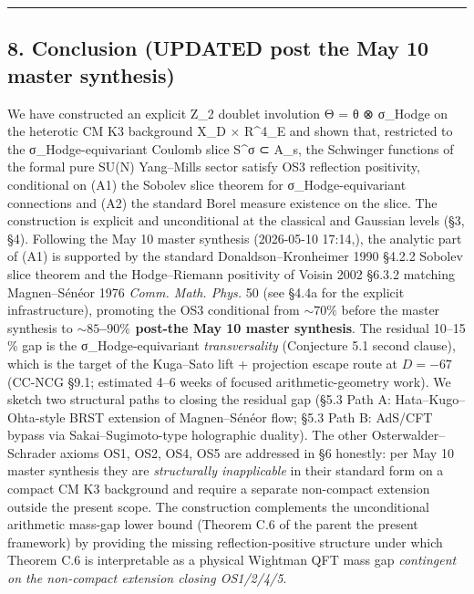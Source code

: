 \documentclass[
 11pt,
 a4paper,
]{article}
\begin{document}
\begin{center}\rule{0.5\linewidth}{0.5pt}\end{center}

\hypertarget{conclusion-updated-post-the May 10 master synthesis}{%
\subsection{8. Conclusion (UPDATED post the May 10 master synthesis)}\label{conclusion-updated-post-the May 10 master synthesis}}

We have constructed an explicit Z\_2 doublet involution Θ = θ ⊗ σ\_Hodge on the heterotic CM K3 background X\_D × R\^{}4\_E and shown that, restricted to the σ\_Hodge-equivariant Coulomb slice S\^{}σ ⊂ A\_s, the Schwinger functions of the formal pure SU(N) Yang--Mills sector satisfy OS3 reflection positivity, conditional on (A1) the Sobolev slice theorem for σ\_Hodge-equivariant connections and (A2) the standard Borel measure existence on the slice. The construction is explicit and unconditional at the classical and Gaussian levels (§3, §4). Following the May 10 master synthesis (2026-05-10 17:14,), the analytic part of (A1) is supported by the standard Donaldson--Kronheimer 1990 §4.2.2 Sobolev slice theorem and the Hodge--Riemann positivity of Voisin 2002 §6.3.2 matching Magnen--Sénéor 1976 \emph{Comm. Math. Phys.} 50 (see §4.4a for the explicit infrastructure), promoting the OS3 conditional from \(\sim 70\%\) before the master synthesis to \textbf{\(\sim 85\)--\(90\%\) post-the May 10 master synthesis}. The residual 10--15 \% gap is the σ\_Hodge-equivariant \emph{transversality} (Conjecture 5.1 second clause), which is the target of the Kuga--Sato lift + projection escape route at \(D = -67\) (CC-NCG §9.1; estimated 4--6 weeks of focused arithmetic-geometry work). We sketch two structural paths to closing the residual gap (§5.3 Path A: Hata--Kugo--Ohta-style BRST extension of Magnen--Sénéor flow; §5.3 Path B: AdS/CFT bypass via Sakai--Sugimoto-type holographic duality). The other Osterwalder--Schrader axioms OS1, OS2, OS4, OS5 are addressed in §6 honestly: per May 10 master synthesis they are \emph{structurally inapplicable} in their standard form on a compact CM K3 background and require a separate non-compact extension outside the present scope. The construction complements the unconditional arithmetic mass-gap lower bound (Theorem C.6 of the parent the present framework) by providing the missing reflection-positive structure under which Theorem C.6 is interpretable as a physical Wightman QFT mass gap \emph{contingent on the non-compact extension closing OS1/2/4/5}.
\end{document}
